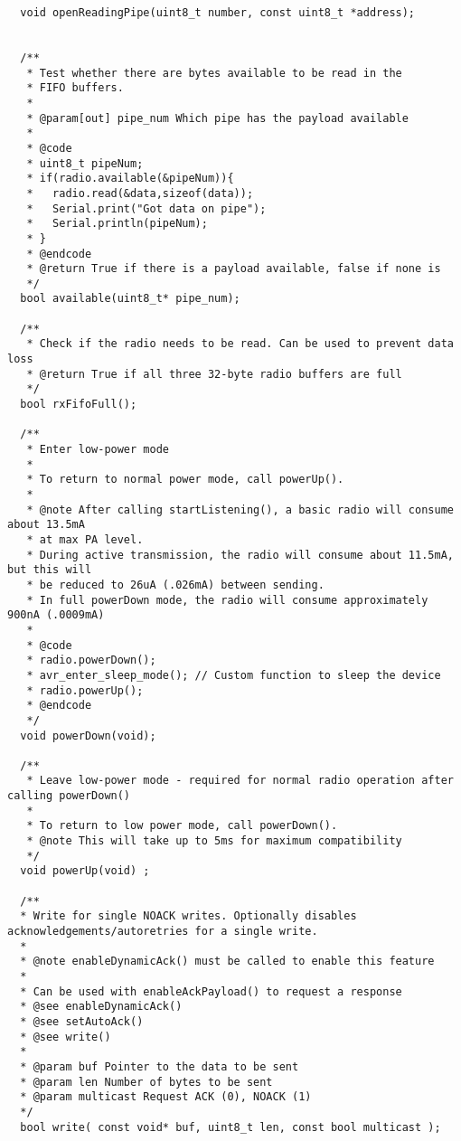\documentclass{article}
\begin{document}
\begin{itemize}
\begin{enumerate}
\begin{enumerate}
\begin{lstlisting}
  void openReadingPipe(uint8_t number, const uint8_t *address);


  /**
   * Test whether there are bytes available to be read in the
   * FIFO buffers. 
   *
   * @param[out] pipe_num Which pipe has the payload available
   *  
   * @code
   * uint8_t pipeNum;
   * if(radio.available(&pipeNum)){
   *   radio.read(&data,sizeof(data));
   *   Serial.print("Got data on pipe");
   *   Serial.println(pipeNum);
   * }
   * @endcode
   * @return True if there is a payload available, false if none is
   */
  bool available(uint8_t* pipe_num);

  /**
   * Check if the radio needs to be read. Can be used to prevent data loss
   * @return True if all three 32-byte radio buffers are full
   */
  bool rxFifoFull();

  /**
   * Enter low-power mode
   *
   * To return to normal power mode, call powerUp().
   *
   * @note After calling startListening(), a basic radio will consume about 13.5mA
   * at max PA level.
   * During active transmission, the radio will consume about 11.5mA, but this will
   * be reduced to 26uA (.026mA) between sending.
   * In full powerDown mode, the radio will consume approximately 900nA (.0009mA)   
   *
   * @code
   * radio.powerDown();
   * avr_enter_sleep_mode(); // Custom function to sleep the device
   * radio.powerUp();
   * @endcode
   */
  void powerDown(void);

  /**
   * Leave low-power mode - required for normal radio operation after calling powerDown()
   * 
   * To return to low power mode, call powerDown().
   * @note This will take up to 5ms for maximum compatibility 
   */
  void powerUp(void) ;

  /**
  * Write for single NOACK writes. Optionally disables acknowledgements/autoretries for a single write.
  *
  * @note enableDynamicAck() must be called to enable this feature
  *
  * Can be used with enableAckPayload() to request a response
  * @see enableDynamicAck()
  * @see setAutoAck()
  * @see write()
  *
  * @param buf Pointer to the data to be sent
  * @param len Number of bytes to be sent
  * @param multicast Request ACK (0), NOACK (1)
  */
  bool write( const void* buf, uint8_t len, const bool multicast );


\end{lstlisting}
\end{enumerate}
\end{enumerate}
\end{itemize}
\end{document}
